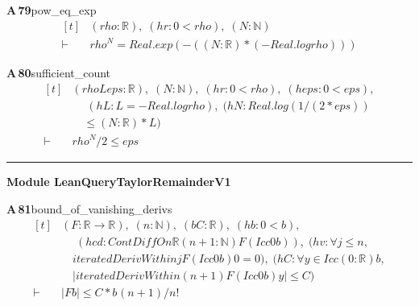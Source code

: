 \documentclass[conference]{IEEEtran}
\theoremstyle{definition}
\newcommand{\lean}[1]{\textsf{\footnotesize #1}}
\begin{document}
\noindent\textbf{A\,79}\quad\lean{pow\_eq\_exp}
{\footnotesize\[ \begin{aligned}[t]
&(\mathit{rho} : \mathbb{R} ),\; (\mathit{hr} : 0 < \mathit{rho}),\; (\mathit{N} : \mathbb{N} )\\
\vdash\;&\mathit{rho} ^{\mathit{N}} = \mathit{Real}.\mathit{exp} (-((\mathit{N} : \mathbb{R} ) * (-\mathit{Real}.\mathit{log} \mathit{rho})))
\end{aligned} \]}

\noindent\textbf{A\,80}\quad\lean{sufficient\_count}
{\footnotesize\[ \begin{aligned}[t]
&(\mathit{rho} \mathit{L} \mathit{eps} : \mathbb{R} ),\; (\mathit{N} : \mathbb{N} ),\; (\mathit{hr} : 0 < \mathit{rho}),\; (\mathit{heps} : 0 < \mathit{eps}),\\
&\quad \; (\mathit{hL} : \mathit{L} = -\mathit{Real}.\mathit{log} \mathit{rho}),\; (\mathit{hN} : \mathit{Real}.\mathit{log} (1 / (2 * \mathit{eps}))\\
&\quad \leq (\mathit{N} : \mathbb{R} ) * \mathit{L})\\
\vdash\;&\mathit{rho} ^{\mathit{N}} / 2 \leq \mathit{eps}
\end{aligned} \]}

\vspace{4pt}\noindent\rule{\columnwidth}{0.4pt}\par\vspace{2pt}
\noindent\textbf{Module \lean{LeanQueryTaylorRemainderV1}}\par\vspace{3pt}

\noindent\textbf{A\,81}\quad\lean{bound\_of\_vanishing\_derivs}
{\footnotesize\[ \begin{aligned}[t]
&(\mathit{F} : \mathbb{R} \to \mathbb{R} ),\; (\mathit{n} : \mathbb{N} ),\; (\mathit{b} \mathit{C} : \mathbb{R} ),\; (\mathit{hb} : 0 < \mathit{b}),\\
&\quad \; (\mathit{hcd} : \mathit{ContDiffOn} \mathbb{R} (\mathit{n} + 1 : \mathbb{N} ) \mathit{F} (\mathit{Icc} 0 \mathit{b})),\; (\mathit{hv} : \forall \mathit{j} \leq \mathit{n},\\
&\quad \mathit{iteratedDerivWithin} \mathit{j} \mathit{F} (\mathit{Icc} 0 \mathit{b}) 0 = 0),\; (\mathit{hC} : \forall \mathit{y} \in \mathit{Icc} (0:\mathbb{R} ) \mathit{b},\\
&\quad |\mathit{iteratedDerivWithin} (\mathit{n} + 1) \mathit{F} (\mathit{Icc} 0 \mathit{b}) \mathit{y}| \leq \mathit{C})\\
\vdash\;&|\mathit{F} \mathit{b}| \leq \mathit{C} * \mathit{b} ^{} (\mathit{n} + 1) / \mathit{n} !
\end{aligned} \]}
\end{document}
